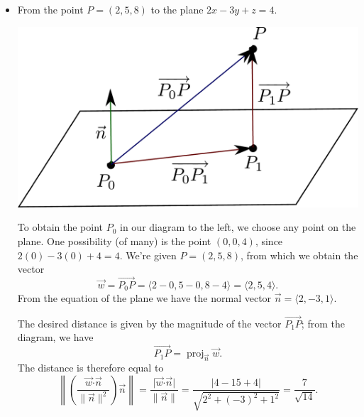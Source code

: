 \documentclass[12pt]{article}
\newcommand{\dotp}{\boldsymbol{\cdot}}
\newcommand{\abs}[1]{\lvert #1\rvert}
\newcommand{\len}[1]{\lVert #1\rVert}
\begin{document}
\begin{enumerate}
\begin{itemize}
\newpage

\item From the point $P=(2,5,8)$ to the plane $2x-3y+z=4$.

\begin{multicols}{2}
 \begin{center}
  \includegraphics[width=0.75\columnwidth]{WS3-4}
 \end{center}
\columnbreak

To obtain the point $P_0$ in our diagram to the left, we choose any point on the plane. One possibility (of many) is the point $(0,0,4)$, since $2(0)-3(0)+4=4$. We're given $P=(2,5,8)$, from which we obtain the vector 
\[
 \vec{w} = \overrightarrow{P_0P} = \langle 2-0,5-0,8-4\rangle = \langle 2,5,4\rangle.
\]
From the equation of the plane we have the normal vector $\vec{n} = \langle 2,-3,1\rangle$. 
\end{multicols}
The desired distance is given by the magnitude of the vector $\overrightarrow{P_1P}$; from the diagram, we have
\[
 \overrightarrow{P_1P} = \operatorname{proj}_{\vec{n}}\vec{w}.
\]
The distance is therefore equal to
\[
 \left\lVert\left(\frac{\vec{w}\dotp\vec{n}}{\len{\vec{n}}^2}\right)\vec{n}\right\rVert = \frac{\abs{\vec{w}\dotp\vec{n}}}{\len{\vec{n}}} = \frac{\abs{4-15+4}}{\sqrt{2^2+(-3)^2+1^2}} = \frac{7}{\sqrt{14}}.
\]
\end{itemize}




\end{enumerate}
\end{document}
